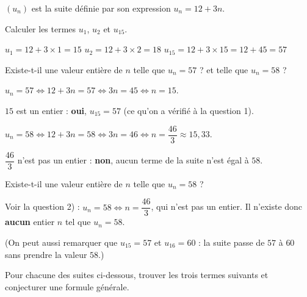 \documentclass[12pt,a4paper]{book}
\begin{document}
\exerciceDS{}

$(u_n)$ est la suite définie par son expression $u_n=12+3n$.
\begin{enumMet}
	\item Calculer les termes $u_1$, $u_2$ et $u_{15}$.

	\begin{corrBox}
		$u_1=12+3\times 1=15$ \qquad $u_2=12+3\times 2=18$ \qquad $u_{15}=12+3\times 15=12+45=57$
	\end{corrBox}
	\item Existe-t-il une valeur entière de $n$ telle que $u_n=57$ ? et telle que $u_n=58$ ?

	\begin{corrBox}
		$u_n=57 \iff 12+3n=57 \iff 3n=45 \iff n=15$.

		$15$ est un entier : \textbf{oui}, $u_{15}=57$ (ce qu'on a vérifié à la question 1).

		$u_n=58 \iff 12+3n=58 \iff 3n=46 \iff n=\dfrac{46}{3}\approx 15,33$.

		$\dfrac{46}{3}$ n'est pas un entier : \textbf{non}, aucun terme de la suite n'est égal à $58$.
	\end{corrBox}
	\item Existe-t-il une valeur entière de $n$ telle que $u_n=58$ ?

	\begin{corrBox}
		Voir la question 2) : $u_n=58 \iff n=\dfrac{46}{3}$, qui n'est pas un entier. Il n'existe donc \textbf{aucun} entier $n$ tel que $u_n=58$.

		(On peut aussi remarquer que $u_{15}=57$ et $u_{16}=60$ : la suite passe de $57$ à $60$ sans prendre la valeur $58$.)
	\end{corrBox}
\end{enumMet}

\exerciceDS{}

Pour chacune des suites ci-dessous, trouver les trois termes suivants et conjecturer une formule générale.
\end{document}

